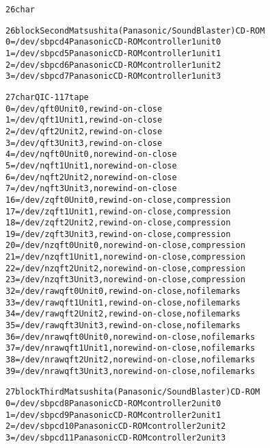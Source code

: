 \documentclass[a4paper,8pt,english]{sphinxmanual}
\begin{document}
\begin{alltt}
  26 char

  26 block      Second Matsushita (Panasonic/SoundBlaster) CD-ROM
                  0 = /dev/sbpcd4       Panasonic CD-ROM controller 1 unit 0
                  1 = /dev/sbpcd5       Panasonic CD-ROM controller 1 unit 1
                  2 = /dev/sbpcd6       Panasonic CD-ROM controller 1 unit 2
                  3 = /dev/sbpcd7       Panasonic CD-ROM controller 1 unit 3

  27 char       QIC-117 tape
                  0 = /dev/qft0         Unit 0, rewind-on-close
                  1 = /dev/qft1         Unit 1, rewind-on-close
                  2 = /dev/qft2         Unit 2, rewind-on-close
                  3 = /dev/qft3         Unit 3, rewind-on-close
                  4 = /dev/nqft0        Unit 0, no rewind-on-close
                  5 = /dev/nqft1        Unit 1, no rewind-on-close
                  6 = /dev/nqft2        Unit 2, no rewind-on-close
                  7 = /dev/nqft3        Unit 3, no rewind-on-close
                 16 = /dev/zqft0        Unit 0, rewind-on-close, compression
                 17 = /dev/zqft1        Unit 1, rewind-on-close, compression
                 18 = /dev/zqft2        Unit 2, rewind-on-close, compression
                 19 = /dev/zqft3        Unit 3, rewind-on-close, compression
                 20 = /dev/nzqft0       Unit 0, no rewind-on-close, compression
                 21 = /dev/nzqft1       Unit 1, no rewind-on-close, compression
                 22 = /dev/nzqft2       Unit 2, no rewind-on-close, compression
                 23 = /dev/nzqft3       Unit 3, no rewind-on-close, compression
                 32 = /dev/rawqft0      Unit 0, rewind-on-close, no file marks
                 33 = /dev/rawqft1      Unit 1, rewind-on-close, no file marks
                 34 = /dev/rawqft2      Unit 2, rewind-on-close, no file marks
                 35 = /dev/rawqft3      Unit 3, rewind-on-close, no file marks
                 36 = /dev/nrawqft0     Unit 0, no rewind-on-close, no file marks
                 37 = /dev/nrawqft1     Unit 1, no rewind-on-close, no file marks
                 38 = /dev/nrawqft2     Unit 2, no rewind-on-close, no file marks
                 39 = /dev/nrawqft3     Unit 3, no rewind-on-close, no file marks

  27 block      Third Matsushita (Panasonic/SoundBlaster) CD-ROM
                  0 = /dev/sbpcd8       Panasonic CD-ROM controller 2 unit 0
                  1 = /dev/sbpcd9       Panasonic CD-ROM controller 2 unit 1
                  2 = /dev/sbpcd10      Panasonic CD-ROM controller 2 unit 2
                  3 = /dev/sbpcd11      Panasonic CD-ROM controller 2 unit 3


\end{alltt}
\end{document}
